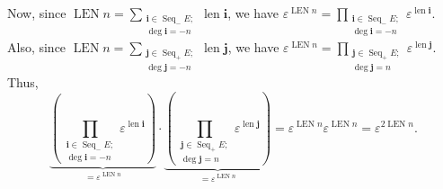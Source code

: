 \documentclass
[numbers=enddot,12pt,final,onecolumn,german,notitlepage]{scrartcl}%
\theoremstyle{definition}
\begin{document}
Now, since $\operatorname*{LEN}n=\sum\limits_{\substack{\mathbf{i}%
\in\operatorname*{Seq}\nolimits_{-}E;\\\deg\mathbf{i}=-n}}\operatorname*{len}%
\mathbf{i}$, we have $\varepsilon^{\operatorname*{LEN}n}=\prod
\limits_{\substack{\mathbf{i}\in\operatorname*{Seq}\nolimits_{-}%
E;\\\deg\mathbf{i}=-n}}\varepsilon^{\operatorname*{len}\mathbf{i}}$. Also,
since $\operatorname*{LEN}n=\sum\limits_{\substack{\mathbf{j}\in
\operatorname*{Seq}\nolimits_{+}E;\\\deg\mathbf{j}=-n}}\operatorname*{len}%
\mathbf{j}$, we have $\varepsilon^{\operatorname*{LEN}n}=\prod
\limits_{\substack{\mathbf{j}\in\operatorname*{Seq}\nolimits_{+}%
E;\\\deg\mathbf{j}=n}}\varepsilon^{\operatorname*{len}\mathbf{j}}$. Thus,%
\begin{equation}
\underbrace{\left(  \prod\limits_{\substack{\mathbf{i}\in\operatorname*{Seq}%
\nolimits_{-}E;\\\deg\mathbf{i}=-n}}\varepsilon^{\operatorname*{len}%
\mathbf{i}}\right)  }_{=\varepsilon^{\operatorname*{LEN}n}}\cdot
\underbrace{\left(  \prod\limits_{\substack{\mathbf{j}\in\operatorname*{Seq}%
\nolimits_{+}E;\\\deg\mathbf{j}=n}}\varepsilon^{\operatorname*{len}\mathbf{j}%
}\right)  }_{=\varepsilon^{\operatorname*{LEN}n}}=\varepsilon
^{\operatorname*{LEN}n}\varepsilon^{\operatorname*{LEN}n}=\varepsilon
^{2\operatorname*{LEN}n}. \label{pf.invformnondeg.polynomiality5.6}%
\end{equation}
\end{document}
